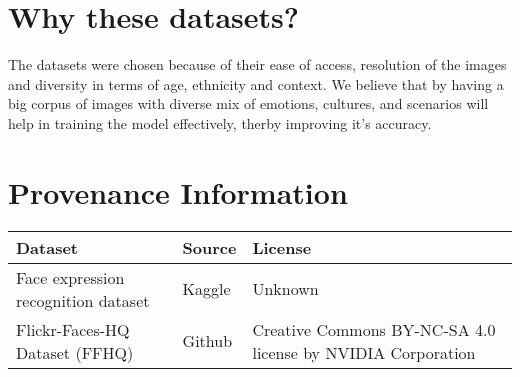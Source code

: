 \section{Why these datasets?}
\noindent The datasets were chosen because of their ease of access, resolution of the images and diversity in terms of age, ethnicity and context. We believe that by having a big corpus of images with diverse mix of emotions, cultures, and scenarios will help in training the model effectively, therby improving it's accuracy. \\
\section{Provenance Information}
    \begin{tabular}{ |p{3cm}||p{3cm} ||p{3cm} | }
        \hline
        \textbf{Dataset} & \textbf{Source} & \textbf{License}\\
        \hline
        Face expression recognition dataset & Kaggle \cite{KaggleDataset} & Unknown\\
        \hline
        Flickr-Faces-HQ Dataset (FFHQ) & Github \cite{FFHQ} & Creative Commons BY-NC-SA 4.0 license by NVIDIA Corporation \cite{CreativeCommonsBY-NC2.0}\\
        \hline
    \end{tabular}
